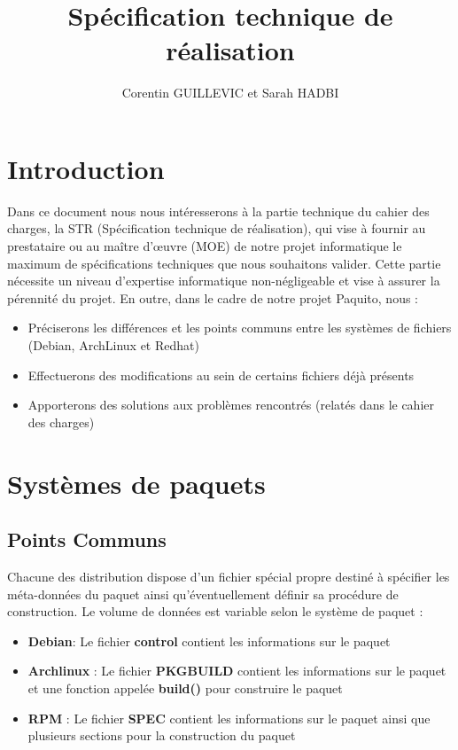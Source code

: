 \documentclass[12pt,a4paper]{article}
\title{Spécification technique de réalisation}
\author{Corentin GUILLEVIC et Sarah HADBI}
\begin{document}
\maketitle
\tableofcontents
\newpage

\section{Introduction}
Dans ce document nous nous intéresserons à la partie technique du cahier des charges, la STR (Spécification technique de réalisation), qui vise à fournir au prestataire ou au maître d'œuvre (MOE) de notre projet informatique le maximum de spécifications techniques que nous souhaitons valider. Cette partie nécessite un niveau d'expertise informatique non-négligeable et vise à assurer la pérennité du projet. En outre, dans le cadre de notre projet Paquito, nous :
\begin{itemize}
	\item Préciserons les différences et les points communs entre les systèmes de fichiers (Debian, ArchLinux et Redhat)
	\item Effectuerons des modifications au sein de certains fichiers déjà présents
	\item Apporterons des solutions aux problèmes rencontrés (relatés dans le cahier des charges)
\end{itemize}

\section{Systèmes de paquets}
\subsection{Points Communs}
Chacune des distribution dispose d'un fichier spécial propre destiné à spécifier les méta-données du paquet ainsi qu'éventuellement définir sa procédure de construction. Le volume de données est variable selon le système de paquet :
\begin{itemize}
	\item \textbf{Debian}:  Le fichier \textbf{control} contient les informations sur le paquet
	\item \textbf{Archlinux} : Le fichier \textbf{PKGBUILD} contient les informations sur le paquet et une fonction appelée \textbf{build()} pour construire le paquet
	\item \textbf{RPM} : Le fichier \textbf{SPEC} contient les informations sur le paquet ainsi que plusieurs sections pour la construction du paquet
\end{itemize}
\end{document}
